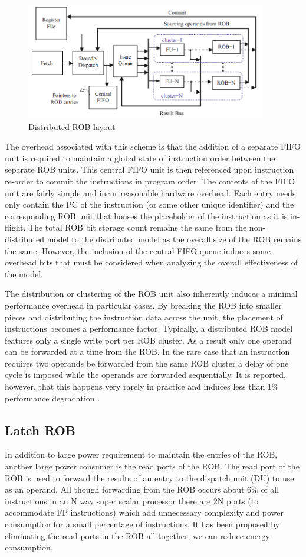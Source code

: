 \begin{figure}
\centering
\includegraphics[height=2in]{clusterROB.png}
\caption{Distributed ROB layout}
\label{fig:distrob}
\end{figure}


The overhead associated with this scheme is that the addition of a separate FIFO unit
is required to maintain a global state of instruction order between the separate ROB units.
This central FIFO unit is then referenced upon instruction re-order to commit the instructions
in program order.  The contents of the FIFO unit are fairly simple and incur reasonable hardware
overhead.  Each entry needs only contain the PC of the instruction (or some other unique identifier)
and the corresponding ROB unit that houses the placeholder of the instruction as it is in-flight. 
The total ROB bit storage count remains the same from the non-distributed model to the distributed model
as the overall size of the ROB remains the same.  However, the inclusion of the central FIFO queue 
induces some overhead bits that must be considered when analyzing the overall effectiveness of the 
model.  

The distribution or clustering of the ROB unit also inherently induces a minimal performance overhead 
in particular cases.  By breaking the ROB into smaller pieces and distributing the instruction 
data across the unit, the placement of instructions becomes a performance factor.  Typically, a 
distributed ROB model features only a single write port per ROB cluster.  As a result only one operand 
can be forwarded at a time from the ROB.  In the rare case that an instruction requires two operands be 
forwarded from the same ROB cluster a delay of one cycle is imposed while the operands are forwarded 
sequentially.  It is reported, however, that this happens very rarely in practice and induces less than 1\% 
performance degradation \cite{rabaey}.
\subsection{Latch ROB}
In addition to large power requirement to maintain the entries of the ROB, another 
large power consumer is the read ports of the ROB.  The read port of the ROB is used
to forward the results of an entry to the dispatch unit (DU) to use as an operand.
All though forwarding from the ROB occurs about 6\%\cite{kucuk} of all instructions 
in an N way super scalar processor there are 2N ports (to accommodate FP
 instructions) which add unnecessary complexity and power consumption for a small 
percentage of instructions.  It has been proposed by eliminating the read ports 
in the ROB all together, we can reduce energy consumption\cite{kucuk}.

